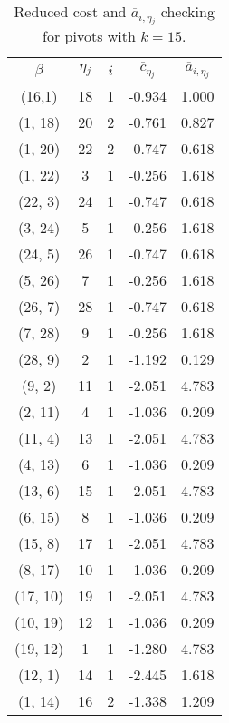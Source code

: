 \begin{table*}[!h]
\centering
\small
\begin{tabular}{|c|c|c|c|c|}\hline
$\beta$ & $\eta{}_j$ & $i$ & $\overline{c}_{\eta{}_j}$ & $\overline{a}_{i,\eta{}_j}$ \\
\hline
(16,1) & 18 & 1 & -0.934 & 1.000\\\hline
(1, 18) & 20 & 2 & 	-0.761 & 0.827\\\hline
(1, 20) & 22 & 2 & -0.747 & 0.618\\\hline
(1, 22) & 3 & 1 & -0.256 & 1.618\\\hline
(22, 3) & 24 & 1 & -0.747 & 0.618\\\hline
(3, 24)  & 5 & 1 & -0.256 & 1.618\\\hline
(24, 5) & 26 & 1 & -0.747 & 0.618\\\hline
(5, 26) & 7 & 1 & -0.256 & 1.618\\\hline
(26, 7) & 28 & 1 & -0.747 & 0.618\\\hline
(7, 28) & 9 & 1& -0.256 & 1.618\\\hline
(28, 9)  & 2 & 1 & -1.192 & 0.129\\\hline
(9, 2) & 11 & 1 & -2.051 & 4.783\\\hline
(2, 11) & 4 & 1 & -1.036 & 0.209\\\hline
(11, 4) & 13 & 1 & -2.051 & 4.783\\\hline
(4, 13) & 6 & 1 & -1.036 & 0.209\\\hline
(13, 6) & 15 & 1 & -2.051 & 4.783\\\hline
(6, 15) & 8 & 1 & -1.036 & 0.209\\\hline
(15, 8) & 17 & 1 & -2.051 & 4.783\\\hline
(8, 17) & 10 & 1 & -1.036 & 0.209\\\hline
(17,  10) & 19 & 1 & -2.051 & 4.783\\\hline
(10, 19) & 12 & 1 & -1.036 & 0.209\\\hline
(19, 12) & 1 & 1 & -1.280 & 4.783\\\hline
(12, 1) & 14 & 1 & -2.445 & 1.618\\\hline
(1, 14) & 16 & 2 & -1.338 & 1.209\\\hline
\end{tabular}
\caption{Reduced cost and $\overline{a}_{i,\eta{}_j}$ checking for pivots with $k=15$.}
\label{tab: k15}
\end{table*}